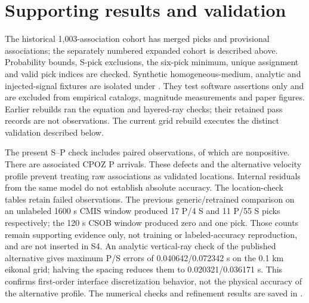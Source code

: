

\section{Supporting results and validation}
The historical 1,003-association cohort has \CurrentPicks{} merged picks and \CurrentEvents{} provisional associations; the separately numbered expanded cohort is described above. Probability bounds, S-pick exclusions, the six-pick minimum, unique assignment and valid pick indices are checked. Synthetic homogeneous-medium, analytic and injected-signal fixtures are isolated under . They test software assertions only and are excluded from empirical catalogs, magnitude measurements and paper figures. Earlier rebuilds ran the equation and layered-ray checks; their retained pass records are not observations. The current grid rebuild executes the distinct validation described below.

The present S--P check includes \CurrentSPPairs{} paired observations, of which \CurrentBadSP{} are nonpositive. There are \CurrentCPOZ{} associated CPOZ P arrivals. These defects and the alternative velocity profile prevent treating raw associations as validated locations. Internal residuals from the same model do not establish absolute accuracy. The location-check tables retain failed observations. The previous generic/retrained comparison on an unlabeled 1600 s CMIS window produced 17 P/4 S and 11 P/55 S picks respectively; the 120 s CSOB window produced zero and one pick. Those counts remain supporting evidence only, not training or labeled-accuracy reproduction, and are not inserted in S4. An analytic vertical-ray check of the published alternative gives maximum P/S errors of 0.040642/0.072342 s on the 0.1 km eikonal grid; halving the spacing reduces them to 0.020321/0.036171 s. This confirms first-order interface discretization behavior, not the physical accuracy of the alternative profile. The numerical checks and refinement results are saved in .

